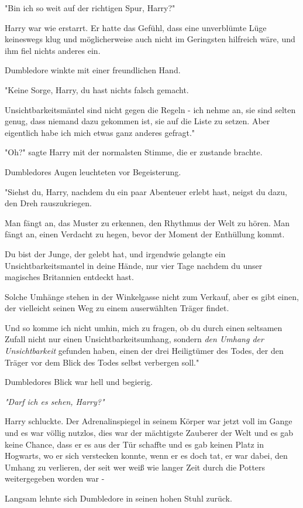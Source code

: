 {"Bin ich so weit auf der richtigen Spur, Harry?"

Harry war wie erstarrt. Er hatte das Gefühl, dass eine unverblümte Lüge keineswegs klug und möglicherweise auch nicht im Geringsten hilfreich wäre, und ihm fiel nichts anderes ein.

Dumbledore winkte mit einer freundlichen Hand.

"Keine Sorge, Harry, du hast nichts falsch gemacht.

Unsichtbarkeitsmäntel sind nicht gegen die Regeln - ich nehme an, sie sind selten genug, dass niemand dazu gekommen ist, sie auf die Liste zu setzen. Aber eigentlich habe ich mich etwas ganz anderes gefragt."

"Oh?" sagte Harry mit der normalsten Stimme, die er zustande brachte.

Dumbledores Augen leuchteten vor Begeisterung.

"Siehst du, Harry, nachdem du ein paar Abenteuer erlebt hast, neigst du dazu, den Dreh rauszukriegen.

Man fängt an, das Muster zu erkennen, den Rhythmus der Welt zu hören. Man fängt an, einen Verdacht zu hegen, bevor der Moment der Enthüllung kommt.

Du bist der Junge, der gelebt hat, und irgendwie gelangte ein Unsichtbarkeitsmantel in deine Hände, nur vier Tage nachdem du unser magisches Britannien entdeckt hast.

Solche Umhänge stehen in der Winkelgasse nicht zum Verkauf, aber es gibt einen, der vielleicht seinen Weg zu einem auserwählten Träger findet.

Und so komme ich nicht umhin, mich zu fragen, ob du durch einen seltsamen Zufall nicht nur einen Unsichtbarkeitsumhang, sondern \emph{den Umhang der Unsichtbarkeit} gefunden haben, einen der drei Heiligtümer des Todes, der den Träger vor dem Blick des Todes selbst verbergen soll."

Dumbledores Blick war hell und begierig.

\emph{"Darf ich es sehen, Harry?"}

Harry schluckte. Der Adrenalinspiegel in seinem Körper war jetzt voll im Gange und es war völlig nutzlos, dies war der mächtigste Zauberer der Welt und es gab keine Chance, dass er es aus der Tür schaffte und es gab keinen Platz in Hogwarts, wo er sich verstecken konnte, wenn er es doch tat, er war dabei, den Umhang zu verlieren, der seit wer weiß wie langer Zeit durch die Potters weitergegeben worden war -

Langsam lehnte sich Dumbledore in seinen hohen Stuhl zurück.

}
